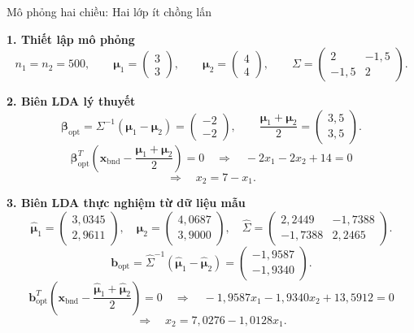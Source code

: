 \documentclass{beamer}
\begin{document}
\begin{frame}{Mô phỏng hai chiều: Hai lớp ít chồng lấn}
	\scriptsize
	\setlength{\abovedisplayskip}{3pt}
	\setlength{\belowdisplayskip}{3pt}
	
	\textbf{1. Thiết lập mô phỏng}
	\[
	n_1=n_2=500,\qquad
	\bm{\mu}_1=
	\begin{pmatrix}
		3\\
		3
	\end{pmatrix},
	\qquad
	\bm{\mu}_2=
	\begin{pmatrix}
		4\\
		4
	\end{pmatrix},
	\qquad
	\Sigma=
	\begin{pmatrix}
		2 & -1{,}5\\
		-1{,}5 & 2
	\end{pmatrix}.
	\]
	
	\textbf{2. Biên LDA lý thuyết}
	\[
	\bm{\beta}_{\text{opt}}
	=
	\Sigma^{-1}(\bm{\mu}_1-\bm{\mu}_2)
	=
	\begin{pmatrix}
		-2\\
		-2
	\end{pmatrix},
	\qquad
	\frac{\bm{\mu}_1+\bm{\mu}_2}{2}
	=
	\begin{pmatrix}
		3{,}5\\
		3{,}5
	\end{pmatrix}.
	\]
	\[
	\bm{\beta}_{\text{opt}}^T
	\left(
	\bm{x}_{\text{bnd}}
	-
	\frac{\bm{\mu}_1+\bm{\mu}_2}{2}
	\right)
	=0
	\quad \Rightarrow \quad
	-2x_1-2x_2+14=0
	\]
	\[
	\Rightarrow \quad
	\boxed{x_2=7-x_1}.
	\]
	
	\textbf{3. Biên LDA thực nghiệm từ dữ liệu mẫu}
	\[
	\widehat{\bm{\mu}}_1=
	\begin{pmatrix}
		3{,}0345\\
		2{,}9611
	\end{pmatrix},
	\quad
	\widehat{\bm{\mu}}_2=
	\begin{pmatrix}
		4{,}0687\\
		3{,}9000
	\end{pmatrix},
	\quad
	\widehat{\Sigma}=
	\begin{pmatrix}
		2{,}2449 & -1{,}7388\\
		-1{,}7388 & 2{,}2465
	\end{pmatrix}.
	\]
	\[
	\bm{b}_{\text{opt}}
	=
	\widehat{\Sigma}^{-1}
	(\widehat{\bm{\mu}}_1-\widehat{\bm{\mu}}_2)
	=
	\begin{pmatrix}
		-1{,}9587\\
		-1{,}9340
	\end{pmatrix}.
	\]
	\[
	\bm{b}_{\text{opt}}^T
	\left(
	\bm{x}_{\text{bnd}}
	-
	\frac{\widehat{\bm{\mu}}_1+\widehat{\bm{\mu}}_2}{2}
	\right)
	=0
	\quad \Rightarrow \quad
	-1{,}9587x_1-1{,}9340x_2+13{,}5912=0
	\]
	\[
	\Rightarrow \quad
	\boxed{x_2=7{,}0276-1{,}0128x_1}.
	\]
\end{frame}
\end{document}
